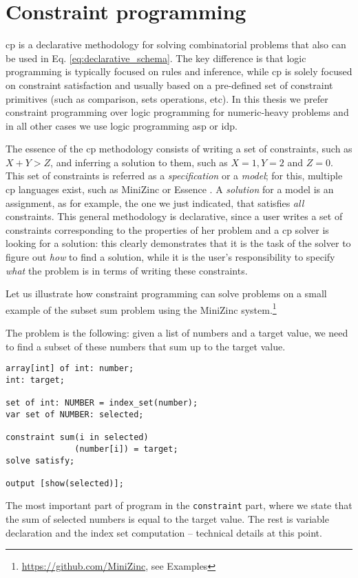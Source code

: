 \section{Constraint programming} \label{sec:cp_intro}
\pubrev
\acrlong{cp} is a declarative methodology for solving combinatorial
problems that also can be used in Eq. \ref{eq:declarative_schema}. The
key difference is that logic programming is typically focused on rules
and inference, while \acrshort{cp} is solely focused on constraint
satisfaction and usually based on a pre-defined set of constraint
primitives (such as comparison, sets operations, etc). In this thesis
we prefer constraint programming over logic programming for
numeric-heavy problems and in all other cases we use logic programming \acrshort{asp} or \acrshort{idp}.
\pubrevend

The essence of the \acrshort{cp} methodology consists of writing a set of
constraints, such as $X + Y > Z$, and inferring a solution to them, such
as $X = 1, Y = 2$ and $Z = 0$. This set of constraints is referred as
a \textit{specification} or a \textit{model}; for this, multiple \acrlong{cp}
languages exist, such as MiniZinc \parencite{minizinc} or Essence
\parencite{essence}. A \textit{solution} for
a model is an assignment, as for example, the one we just indicated, that satisfies
\textit{all} constraints. This general methodology is declarative,
since a user writes a set of constraints corresponding to the
properties of her problem and a \acrshort{cp} solver is looking for a
solution: this clearly demonstrates that it is the task of the solver
to figure out \textit{how} to find a solution, while it is the user's
responsibility to specify \textit{what} the problem is in terms of
writing these constraints.

\begin{example}
    Let us illustrate how constraint programming can solve problems on
    a small example of the subset sum problem using the MiniZinc
    system.\footnote{\url{https://github.com/MiniZinc}, see Examples} 

The problem is the following: given a list of numbers and a target
    value, we need to find a subset of these numbers that sum up to
    the target value.
    \begin{minipage}{\linewidth}
    \begin{lstlisting}[caption=An example of a MiniZinc program, label=lst:example_asp_program,basicstyle=\ttfamily]
array[int] of int: number;
int: target;

set of int: NUMBER = index_set(number);
var set of NUMBER: selected;

constraint sum(i in selected)
              (number[i]) = target;
solve satisfy;

output [show(selected)];
\end{lstlisting}
\end{minipage}
The most important part of program in the \texttt{constraint}
part, where we state that the sum of selected numbers is equal to
the target value. The rest is variable declaration and the index
set computation -- technical details at this point.
\end{example}



